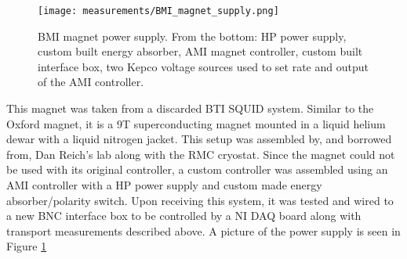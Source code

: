 \begin{figure}
    \centering
    \texttt{[image: measurements/BMI\_magnet\_supply.png]}
    \caption{BMI magnet power supply. From the bottom: HP power supply, custom built energy absorber, AMI magnet controller, custom built interface box, two Kepco voltage sources used to set rate and output of the AMI controller.}
    \label{fig:magnet_supply}
\end{figure}

This magnet was taken from a discarded BTI SQUID system. Similar to the Oxford magnet, it is a 9T superconducting magnet mounted in a liquid helium dewar with a liquid nitrogen jacket. This setup was assembled by, and borrowed from, Dan Reich's lab along with the RMC cryostat. Since the magnet could not be used with its original controller, a custom controller was assembled using an AMI controller with a HP power supply and custom made energy absorber/polarity switch. Upon receiving this system, it was tested and wired to a new BNC interface box to be controlled by a NI DAQ board along with transport measurements described above. A picture of the power supply is seen in Figure \ref{fig:magnet_supply}